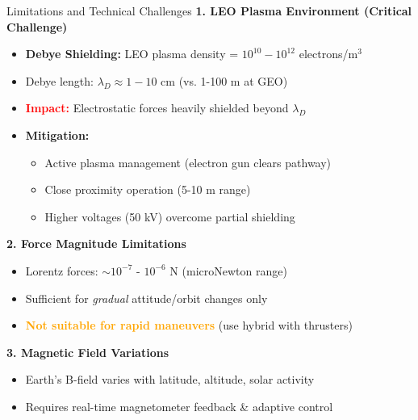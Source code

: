 \documentclass[aspectratio=169]{beamer}
\begin{document}
\begin{frame}{Limitations and Technical Challenges}
\textbf{1. LEO Plasma Environment (Critical Challenge)}
\begin{itemize}
    \item \textbf{Debye Shielding:} LEO plasma density = $10^{10}-10^{12}$ electrons/m$^3$
    \item Debye length: $\lambda_D \approx 1-10$ cm (vs. 1-100 m at GEO)
    \item \textcolor{red}{\textbf{Impact:}} Electrostatic forces heavily shielded beyond $\lambda_D$
    \item \textbf{Mitigation:}
    \begin{itemize}
        \item Active plasma management (electron gun clears pathway)
        \item Close proximity operation (5-10 m range)
        \item Higher voltages (50 kV) overcome partial shielding
    \end{itemize}
\end{itemize}

\vspace{0.3cm}
\textbf{2. Force Magnitude Limitations}
\begin{itemize}
    \item Lorentz forces: $\sim 10^{-7}$ - $10^{-6}$ N (microNewton range)
    \item Sufficient for \textit{gradual} attitude/orbit changes only
    \item \textcolor{orange}{\textbf{Not suitable for rapid maneuvers}} (use hybrid with thrusters)
\end{itemize}

\vspace{0.3cm}
\textbf{3. Magnetic Field Variations}
\begin{itemize}
    \item Earth's B-field varies with latitude, altitude, solar activity
    \item Requires real-time magnetometer feedback \& adaptive control
\end{itemize}
\end{frame}
\end{document}
